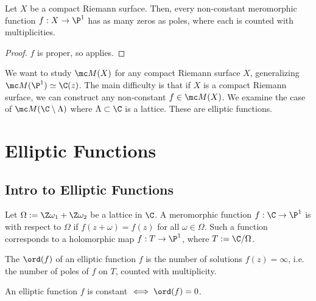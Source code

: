 \documentclass[11pt]{report}
\begin{document}
\begin{cor}
    Let $X$ be a compact Riemann surface. Then, every non-constant meromorphic function $f:X \to \P^1$ has as many zeros as poles, where each is counted with multiplicities.
\end{cor}

\begin{proof}
    $f$ is proper, so  applies.
\end{proof}

We want to study $\mc M(X)$ for any compact Riemann surface $X$, generalizing $\mc M(\P^1) \simeq \C(z)$. The main difficulty is that if $X$ is a compact Riemann surface, we can construct any non-constant $f \in \mc M(X)$. We examine the case of $\mc M(\C\setminus \Lambda)$ where $\Lambda \subset \C$ is a lattice. These are elliptic functions.


\chapter{Elliptic Functions}

\section{Intro to Elliptic Functions}

\begin{defn}
    Let $\Omega:= \Z\omega_1  +\Z\omega_2$ be a lattice in $\C$. A meromorphic function $f:\C \to \P^1$ is  with respect to $\Omega$ if $f(z+\omega)=f(z)$ for all $\omega \in \Omega$. Such a function corresponds to a holomorphic map $f:T \to \P^1$, where $T:=\C/\Omega$.
\end{defn}

\begin{defn}
    The  $\ord(f)$ of an elliptic function $f$ is the number of solutions $f(z) = \infty$, i.e. the number of poles of $f$ on $T$, counted with multiplicity.
\end{defn}

\begin{rmk}
    An elliptic function $f$ is constant $\iff \ord(f)=0$.
\end{rmk}
\end{document}
